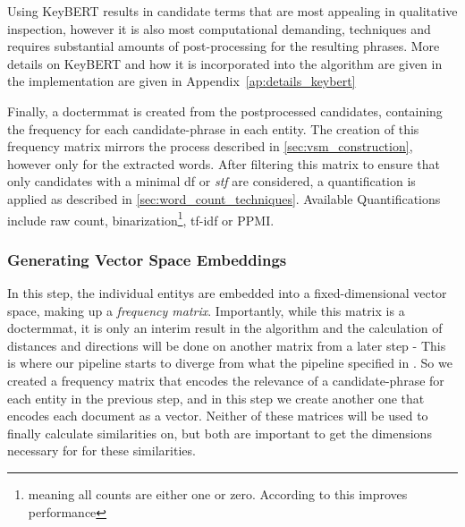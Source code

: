 Using KeyBERT results in candidate terms that are most appealing in qualitative inspection, however it is also most computational demanding, techniques and requires substantial amounts of post-processing for the resulting phrases. More details on KeyBERT and how it is incorporated into the algorithm are given in the implementation are given in Appendix~\ref{ap:details_keybert}

Finally, a \gls{doctermmat} is created from the postprocessed candidates, containing the frequency for each candidate-phrase in each entity. The creation of this frequency matrix mirrors the process described in \autoref{sec:vsm_construction}, however only for the extracted words. After filtering this matrix to ensure that only candidates with a minimal \gls{df} or \textit{stf} are considered, a quantification is applied as described in \autoref{sec:word_count_techniques}. Available Quantifications include raw count, binarization\footnote{meaning all counts are either one or zero. According to \cite{Alshaikh2020} this improves performance }, tf-idf or PPMI.

\cite{Derrac2015} 



\subsubsection{Generating Vector Space Embeddings}
\label{sec:generate_vectorspaces}


In this step, the individual \glspl{entity} are embedded into a fixed-dimensional vector space, making up a \emph{frequency matrix}. Importantly, while this matrix is a \gls{doctermmat}, it is only an interim result in the algorithm and the calculation of distances and directions will be done on another matrix from a later step - This is where our pipeline starts to diverge from what the pipeline specified in . So we created a frequency matrix that encodes the relevance of a candidate-phrase for each entity in the previous step, and in this step we create another one that encodes each document as a vector. Neither of these matrices will be used to finally calculate similarities on, but both are important to get the dimensions necessary for for these similarities.


